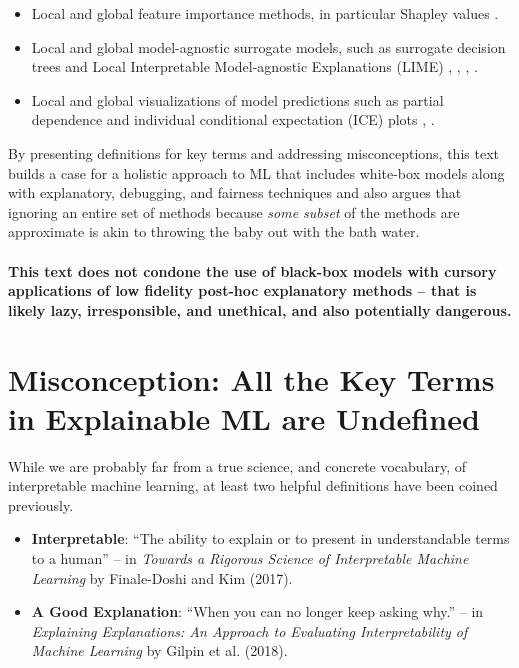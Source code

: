 \documentclass{article}
\begin{document}
\begin{itemize}
\item Local and global feature importance methods, in particular Shapley values \cite{shapley}.
\item Local and global model-agnostic surrogate models, such as surrogate decision trees and Local Interpretable Model-agnostic Explanations (LIME) \cite{dt_surrogate1}, \cite{dt_surrogate2}, \cite{lime-sup}, \cite{lime}. 
\item Local and global visualizations of model predictions such as partial dependence and individual conditional expectation (ICE) plots \cite{esl}, \cite{ice_plots}.
\end{itemize}

By presenting definitions for key terms and addressing misconceptions, this text builds a case for a holistic approach to ML that includes white-box models along with explanatory, debugging, and fairness techniques and also argues that ignoring an entire set of methods because \textit{some subset} of the methods are approximate is akin to throwing the baby out with the bath water. 

\paragraph{This text does not condone the use of black-box models with cursory applications of low fidelity post-hoc explanatory methods -- that is likely lazy, irresponsible, and unethical, and also potentially dangerous.}

\section{Misconception: All the Key Terms in Explainable ML are Undefined}

While we are probably far from a true science, and concrete vocabulary, of interpretable machine learning, at least two helpful definitions have been coined previously.

\begin{itemize}
\item \textbf{Interpretable}: ``The ability to explain or to present in understandable terms to a human'' -- in \textit{Towards a Rigorous Science of Interpretable Machine Learning} by Finale-Doshi and Kim (2017).
\item \textbf{A Good Explanation}: ``When you can no longer keep asking why.'' -- in \textit{Explaining Explanations: An Approach to Evaluating Interpretability of Machine Learning} by Gilpin et al. (2018).
\end{itemize}
\end{document}
